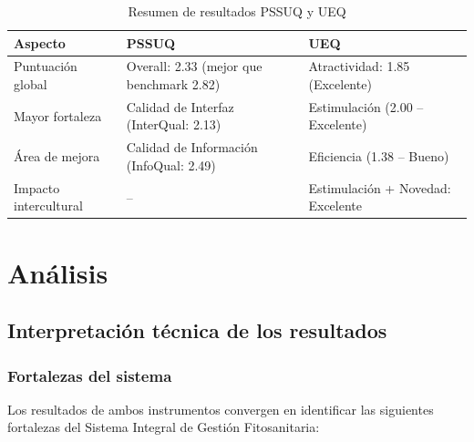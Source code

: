 \documentclass[a4paper,12pt]{report}
\begin{document}
\begin{table}[H]
    \centering
    \caption{Resumen de resultados PSSUQ y UEQ}
    \label{tab:resumen_resultados}
    \begin{tabular}{p{4cm} p{4cm} p{5cm}}
        \toprule
        \textbf{Aspecto} & \textbf{PSSUQ} & \textbf{UEQ} \\
        \midrule
        Puntuación global & Overall: 2.33 (mejor que benchmark 2.82) & Atractividad: 1.85 (Excelente) \\
        Mayor fortaleza & Calidad de Interfaz (InterQual: 2.13) & Estimulación (2.00 -- Excelente) \\
        Área de mejora & Calidad de Información (InfoQual: 2.49) & Eficiencia (1.38 -- Bueno) \\
        Impacto intercultural & -- & Estimulación + Novedad: Excelente \\
        \bottomrule
    \end{tabular}
\end{table}


\newpage

\chapter{Análisis}

\section{Interpretación técnica de los resultados}

\subsection{Fortalezas del sistema}

Los resultados de ambos instrumentos convergen en identificar las siguientes fortalezas del Sistema Integral de Gestión Fitosanitaria:
\end{document}
